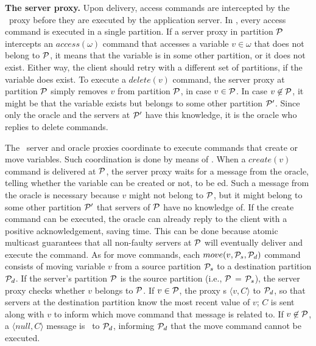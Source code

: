 

\textbf{The server proxy.} Upon delivery, access commands are intercepted by the
\dssmr\ proxy before they are executed by the application server. In \dssmr{},
every access command is executed in a single partition. If a server proxy in
partition $\mathcal{P}$ intercepts an $access(\omega)$ command that accesses a variable
$v \in \omega$ that does not belong to $\mathcal{P}$, it means that the variable is in
some other partition, or it does not exist. Either way, the client should retry
with a different set of partitions, if the variable does exist. To execute a
$delete(v)$ command, the server proxy at partition $\mathcal{P}$ simply removes $v$
from partition $\mathcal{P}$, in case $v \in \mathcal{P}$. In case $v \not\in \mathcal{P}$, it might
be that the variable exists but belongs to some other partition $\mathcal{P}'$. Since
only the oracle and the servers at $\mathcal{P}'$ have this knowledge, it is the oracle
who replies to delete commands.

The \dssmr\ server and oracle proxies coordinate to execute commands that create or
move variables. Such coordination is done by means of \rmcast{}. When a
$create(v)$ command is delivered at $\mathcal{P}$, the server proxy waits for a message
from the oracle, telling whether the variable can be created or not, to be
\rmdel{}ed. Such a message from the oracle is necessary because $v$ might not
belong to $\mathcal{P}$, but it might belong to some other partition $\mathcal{P}'$ that
servers of $\mathcal{P}$ have no knowledge of. If the create command can be executed,
the oracle can already reply to the client with a positive acknowledgement,
saving time. This can be done because atomic multicast guarantees that all
non-faulty servers at $\mathcal{P}$ will eventually deliver and execute the command. As
for move commands, each $move(v,\mathcal{P}_s,\mathcal{P}_d)$ command consists of moving
variable $v$ from a source partition $\mathcal{P}_s$ to a destination partition
$\mathcal{P}_d$. If the server's partition $\mathcal{P}$ is the source partition (i.e., $\mathcal{P}$
= $\mathcal{P}_s$), the server proxy checks whether $v$ belongs to $\mathcal{P}$. If $v \in
\mathcal{P}$, the proxy \rmcast{}s $\langle v, C \rangle$ to $\mathcal{P}_d$, so that servers
at the destination partition know the most recent value of $v$; $C$ is sent
along with $v$ to inform which move command that message is related to. If $v
\not\in \mathcal{P}$, a $\langle null, C \rangle$ message is \rmcast\ to $\mathcal{P}_d$,
informing $\mathcal{P}_d$ that the move command cannot be executed.



